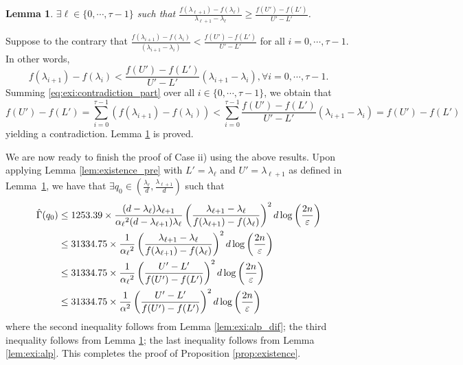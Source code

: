 \documentclass[onecolumn,letterpaper]{IEEEtran}
\newtheorem{lemma}{Lemma}
\newcommand{\cp}{{q}}
\newcommand{\up}{{U}}
\newcommand{\lw}{{L}}
\newcommand{\ap}{{\alpha}}
\newcommand{\exi}{{i}}
\newcommand{\exind}{{\ell}}
\newcommand{\sig}{{\lambda}}
\newcommand{\sigi}{{\sig_{\exi}}}
\newcommand{\sigio}{{\sig_{\exi+1}}}
\newcommand{\sigind}{{\sig_{\exind}}}
\newcommand{\sigindo}{{\sig_{\exind+1}}}
\newcommand{\ta}{{\tau}}
\newcommand{\alp}{{\ap}}
\newcommand{\alpind}{{\alp_{\exind}}}
\newcommand{\slp}{{\vartheta}}
\newcommand{\slpi}{{\slp_{\exi}}}
\newcommand{\ftaup}{{\hat{\Gamma}}}
\newcommand{\cpns}{\cp_0}
\newcommand{\fTpns}{\ftaup (\cpns)}
\begin{document}
\begin{lemma} 
\label{lem:exi:slp}
$\exists \exind \in \{ 0,\cdots,\ta-1 \}$ such that $\frac{f(\sigindo)-f(\sigind)}{\sigindo-\sigind} \ge \frac{f(\up')-f(\lw')}{\up'-\lw'}$. 
\end{lemma}
\begin{IEEEproof}
Suppose to the contrary that $\frac{ f(\sigio)-f(\sigi)}{ (\sigio-\sigi) } < \frac{f(\up')-f(\lw')}{\up'-\lw'}$ for all $\exi = 0,\cdots,\ta-1 $. In other words,
\begin{equation} \label{eq:exi:contradiction_part}
    f(\sigio)-f(\sigi)  < \frac{f(\up')-f(\lw')}{\up'-\lw'}(\sigio-\sigi), \forall \exi = 0,\cdots,\ta-1 .
\end{equation}
Summing \eqref{eq:exi:contradiction_part} over all $\exi \in \{0,\cdots,\ta-1\} $, we obtain that
\begin{equation}
    f(\up') - f(\lw') = \sum\limits_{\exi=0}^{\ta-1} \left(f(\sigio)-f(\sigi)\right) < \sum\limits_{\exi=0}^{\ta-1} \frac{f(\up')-f(\lw')}{\up'-\lw'} (\sigio-\sigi) = f(\up') - f(\lw')
\end{equation}
yielding a contradiction. Lemma \ref{lem:exi:slp} is proved.
\end{IEEEproof}

We are now ready to finish the proof of Case ii) using the above results. Upon applying Lemma \ref{lem:existence_pre} with $\lw' = \sigind$ and $\up' = \sigindo$ as defined in Lemma~\ref{lem:exi:slp}, we have that
$\exists \cpns \in \left(\frac{\sigind}{d} , \frac{\sigindo}{d}\right) $    such that 
\begin{align} 
\fTpns  &\leq 1253.39 \times \frac{(d-\sigind ) \sigindo }{\alpind^2 (d-\sigindo)\sigind} \left( \frac{\sigindo-\sigind}{f(\sigindo)-f(\sigind)} \right)^2  d\log \left( \frac{2n}{\varepsilon } \right) \notag\\ 
&\le 31334.75 \times \frac{1}{\alpind^2} \left( \frac{\sigindo-\sigind}{f(\sigindo)-f(\sigind)} \right)^2  d\log \left( \frac{2n}{\varepsilon } \right) \notag\\ 
&\le 31334.75 \times \frac{1}{\alpind^2} \left( \frac{\up'-\lw'}{f(\up')-f(\lw')} \right)^2  d\log \left( \frac{2n}{\varepsilon } \right) \notag\\ 
&\le 31334.75 \times \frac{1}{\alp^2} \left( \frac{\up'-\lw'}{f(\up')-f(\lw')} \right)^2  d\log \left( \frac{2n}{\varepsilon } \right)  
\end{align} 
where the second inequality follows from Lemma  \ref{lem:exi:alp_dif}; the third inequality follows from Lemma \ref{lem:exi:slp}; the last inequality follows from Lemma \ref{lem:exi:alp}. %
This completes the proof of Proposition \ref{prop:existence}.
\end{document}
